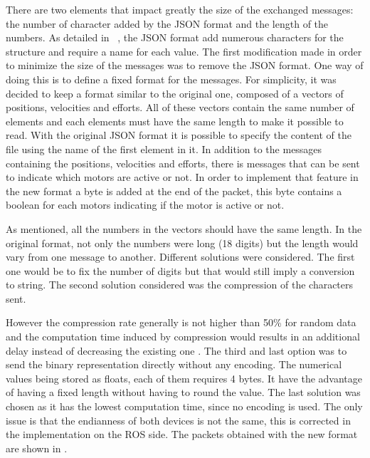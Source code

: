 There are two elements that impact greatly the size of the exchanged messages: the number of character added by the JSON format and the length of the numbers.
As detailed in ~, the JSON format add numerous characters for the structure and require a name for each value. The first modification made in order to minimize the size of the messages was to remove the JSON format. One way of doing this is to define a fixed format for the messages. For simplicity, it was decided to keep a format similar to the original one, composed of a vectors of positions, velocities and efforts. All of these vectors contain the same number of elements and each elements must have the same length to make it possible to read. 
With the original \gls{JSON} format it is possible to specify the content of the file using the name of the first element in it. In addition to the messages containing the positions, velocities and efforts, there is messages that can be sent to indicate which motors are active or not. In order to implement that feature in the new format a byte is added at the end of the packet, this byte contains a boolean for each motors indicating if the motor is active or not.

As mentioned, all the numbers in the vectors should have the same length. In the original format, not only the numbers were long (18 digits) but the length would vary from one message to another. Different solutions were considered. The first one would be to fix the number of digits but that would still imply a conversion to string. The second solution considered was the compression of the characters sent. 

 However the compression rate generally is not higher than 50\% for random data and the computation time induced by compression would results in an additional delay instead of decreasing the existing one \cite{simple_compression}\cite{fast_ZIV}. The third and last option was to send the binary representation directly without any encoding. The numerical values being stored as floats, each of them requires 4 bytes. It have the advantage of having a fixed length without having to round the value. The last solution was chosen as it has the lowest computation time, since no encoding is used. The only issue is that the endianness of both devices is not the same, this is corrected in the implementation on the ROS side. The packets obtained with the new format are shown in .%

